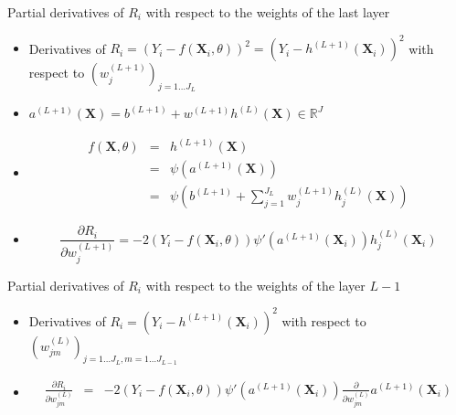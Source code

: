\documentclass[compress,10pt]{beamer}
\begin{document}
\begin{frame}{Partial derivatives of \(R_i\) with respect to the weights
of the last layer}


\begin{itemize}
\item
  Derivatives of
  \(R_i = \left(Y_{i} - f(\mathbf{X}_i,\theta)\right)^2= \left(Y_i - h^{(L+1)}(\mathbf{X}_i)\right)^2\)
  with respect to \((w_j^{(L+1)})_{j=1\dots J_{L}}\)
\item
  \(a^{(L+1)}(\mathbf{X}) = b^{(L+1)} +w^{(L+1)} h^{(L)}(\mathbf{X}) \in \mathbb{R}^J\)
\item
  \begin{eqnarray*}
  f(\mathbf{X} ,\theta) &=& h^{(L+1)}(\mathbf{X}) \\
  &=& \psi(a^{(L+1)}(\mathbf{X}))  \\
  & =& \psi\left(b^{(L+1)} +\sum_{j=1}^{J_L} w_j^{(L+1)} h_j^{(L)}(\mathbf{X}) \right)
  \end{eqnarray*}
\item
  \[ \frac{\partial R_i }{\partial w^{(L+1)}_{j}} = -2\left(Y_{i} - f(\mathbf{X}_i,\theta)\right)\psi'\left(a^{(L+1)}(\mathbf{X}_i)\right)h_j^{(L)}(\mathbf{X}_i)\]
\end{itemize}

\end{frame}
\begin{frame}{Partial derivatives of \(R_i\) with respect to the weights
of the layer \(L-1\)}
\protect\hypertarget{partial-derivatives-of-r_i-with-respect-to-the-weights-of-the-layer-l-1}{}

\begin{itemize}
\item
  Derivatives of \(R_i = \left(Y_i - h^{(L+1)}(\mathbf{X}_i)\right)^2\)
  with respect to \((w_{jm}^{(L)})_{j=1\dots J_{L},m=1\dots J_{L-1}}\)
\item
  \begin{eqnarray*}
  \frac{\partial R_i }{\partial w^{(L)}_{jm}} &=& -2\left(Y_{i} - f(\mathbf{X}_i,\theta)\right)\psi'\left(a^{(L+1)}(\mathbf{X}_i)\right) \frac{\partial}{\partial w^{(L)}_{jm}}  a^{(L+1)}(\mathbf{X}_i)
  \end{eqnarray*}
\end{itemize}

\end{frame}
\end{document}
